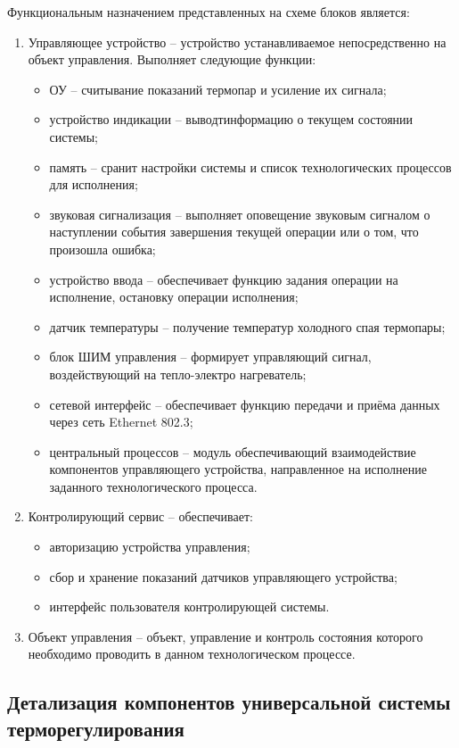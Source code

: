 Функциональным назначением представленных на схеме блоков является:
\begin{enumerate}
	\item{} Управляющее устройство -- устройство устанавливаемое непосредственно
	на объект управления. Выполняет следующие функции:
		\begin{itemize}
			\item{} ОУ -- считывание показаний термопар и усиление их сигнала;
			\item{} устройство индикации -- выводтинформацию о текущем состоянии системы;
			\item{} память -- сранит настройки системы и список технологических процессов для
				исполнения;
			\item{} звуковая сигнализация -- выполняет оповещение звуковым сигналом о
				наступлении события завершения текущей операции или о том, что произошла ошибка;
			\item{} устройство ввода -- обеспечивает функцию задания операции на исполнение,
				остановку операции исполнения;
			\item{} датчик температуры -- получение температур холодного спая термопары;
			\item{} блок ШИМ управления -- формирует управляющий сигнал, воздействующий на
				тепло-электро нагреватель;
			\item{} сетевой интерфейс -- обеспечивает функцию передачи и приёма данных
				через сеть Ethernet 802.3;
			\item{} центральный процессов -- модуль обеспечивающий взаимодействие компонентов
				управляющего устройства, направленное на исполнение заданного технологического
				процесса.
		\end{itemize}
	\item{} Контролирующий сервис -- обеспечивает:
	 	\begin{itemize}
			\item{} авторизацию устройства управления;
			\item{} сбор и хранение показаний датчиков управляющего устройства;
			\item{} интерфейс пользователя контролирующей системы.
		\end{itemize}
	\item{} Объект управления -- объект, управление и контроль состояния которого необходимо проводить
		в данном технологическом процессе.
\end{enumerate}


\subsection{Детализация компонентов универсальной системы терморегулирования}



